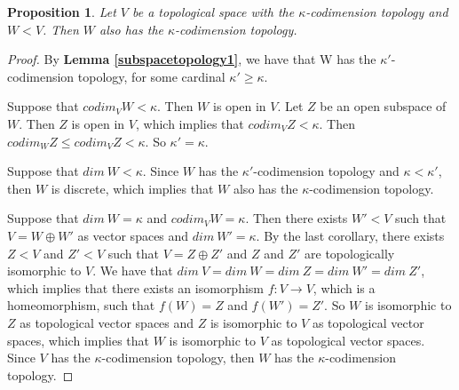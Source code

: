 \documentclass[10pt,a4paper]{amsart}
\newtheorem{prop}{Proposition}
\begin{document}
\begin{prop}\label{subspacetopology}Let $V$ be a topological space with the $\kappa$-codimension topology and $W < V$. Then $W$ also has the $\kappa$-codimension topology.
\end{prop}

\begin{proof}By \textbf{Lemma \ref{subspacetopology1}}, we have that W has the $\kappa'$-codimension topology, for some cardinal $\kappa' \geqslant \kappa$.

Suppose that $codim_{V} W < \kappa$. Then $W$ is open in $V$. Let $Z$ be an open subspace of $W$. Then $Z$ is open in $V$, which implies that $codim_{V} Z < \kappa$. Then $codim_{W}Z \leqslant codim_{V}Z < \kappa$. So $\kappa' = \kappa$.

Suppose that $dim \ W < \kappa$. Since $W$ has the $\kappa'$-codimension topology and $\kappa < \kappa'$, then $W$ is discrete, which implies that $W$ also has the $\kappa$-codimension topology.

Suppose that $dim \ W = \kappa$ and $codim_{V} W = \kappa$. Then there exists $W' < V$ such that $V = W \oplus W'$ as vector spaces and $dim \ W' = \kappa$. By the last corollary, there exists $Z < V$ and $Z'< V$ such that $V = Z \oplus Z'$ and $Z$ and $Z'$ are topologically isomorphic to $V$. We have that $dim \ V = dim \ W = dim \ Z = dim \ W' = dim \ Z'$, which implies that there exists an isomorphism $f: V \rightarrow V$, which is a homeomorphism, such that $f(W) = Z$ and $f(W') = Z'$. So $W$ is isomorphic to $Z$ as topological vector spaces and $Z$ is isomorphic to $V$ as topological vector spaces, which implies that $W$ is isomorphic to $V$ as topological vector spaces. Since $V$ has the $\kappa$-codimension topology, then $W$ has the $\kappa$-codimension topology.
\end{proof}
\end{document}
